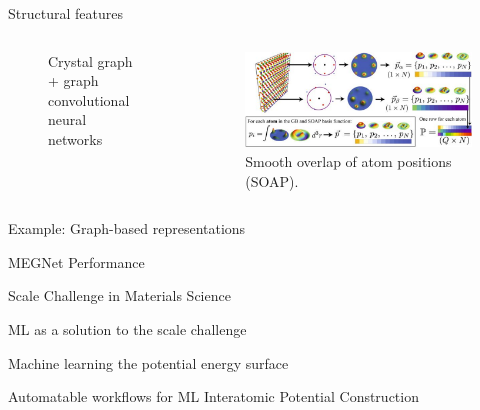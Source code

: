 \documentclass[aspectratio=169]{beamer}
\begin{document}
\begin{frame}{Structural features}
\begin{columns}
\begin{figure}
            \caption{Crystal graph + graph convolutional neural networks}
        \end{figure}
        \begin{figure}
            \centering
            \includegraphics[width=\textwidth]{lectures/slides_tex/figures/soap.png}
            \caption{Smooth overlap of atom positions (SOAP).\cite{rosenbrockDiscoveringBuildingBlocks2017}}
        \end{figure}
    \end{columns}
\end{frame}


\begin{frame}{Example: Graph-based representations}
    
\end{frame}


\begin{frame}{MEGNet Performance}
    
\end{frame}


\begin{frame}{Scale Challenge in Materials Science}
    
\end{frame}


\begin{frame}{ML as a solution to the scale challenge}
    
\end{frame}


\begin{frame}{Machine learning the potential energy surface}
    
\end{frame}


\begin{frame}{Automatable workflows for ML Interatomic Potential Construction}
    
\end{frame}
\end{document}
